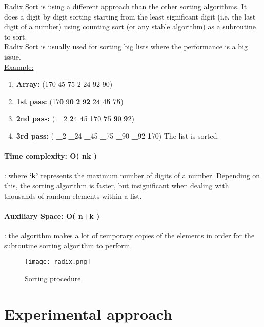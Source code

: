 \documentclass{article}
\begin{document}
Radix Sort is using a different approach than the other sorting algorithms. It does a digit
by digit sorting starting from the least significant digit (i.e. the last digit of a number)
using counting sort (or any stable algorithm) as a subroutine to sort.\\
Radix Sort is usually used for sorting big lists where the performance is a big issue.\hfill \break \\


\noindent\underline{Example:}

\begin{enumerate}
    \item \textbf{Array:} (170 45 75 2 24 92 90)
    \item \textbf{1st pass:} (17\textbf{0} 9\textbf{0} \textbf{2} 9\textbf{2} 2\textbf{4} 4\textbf{5} 7\textbf{5})
    \item \textbf{2nd pass:} ( \textbf{\_}2 \textbf{2}4 \textbf{4}5 1\textbf{7}0 \textbf{7}5 \textbf{9}0 \textbf{9}2)
    \item \textbf{3rd pass:} ( \textbf{\_}2 \textbf{\_}24 \textbf{\_}45 \textbf{\_}75 \textbf{\_}90 \textbf{\_}92 \textbf{1}70) The list is sorted.
\end{enumerate}

\paragraph{Time complexity: O( nk )}: where \textbf{‘k’} represents the maximum number of digits of a number. Depending on this, the sorting algorithm is faster, but insignificant when dealing with thousands of random elements within a list.

\paragraph{Auxiliary Space: O( n+k )}: the algorithm makes a lot of temporary copies of the elements in order for the subroutine sorting algorithm to perform.\hfill \break \\




\begin{figure}[h!]
\centering
\texttt{[image: radix.png]}
\caption{\label{fig:Radix} Sorting procedure.}
\end{figure}






\section{Experimental approach}
\label{code}
\end{document}
